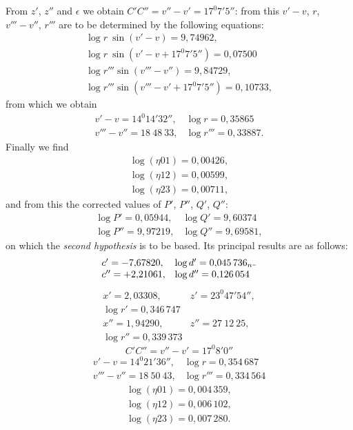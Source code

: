 From $z'$, $z''$ and $\epsilon$ we obtain $C'C'' = v''-v' = 17^{0}7'5''$: from this
$v'-v$, $r$, $v'''-v''$, $r'''$ are to be determined by the following equations:
\[
\begin{array}{l}
\log r\ \sin(v'-v) = 9{,}74962, \\ \log r\ \sin(v'-v+17^{0}7'5'') = 0{,}07500 \\
\log r'''\sin(v'''-v'') = 9{,}84729, \\ \log r'''\sin(v'''-v'+17^{0}7'5'') = 0{,}10733,
\end{array}
\]
from which we obtain
\[
\begin{array}{ll}
v'-v = 14^{0}14'32'', & \log r = 0{,}35865 \\
v'''-v'' = 18\ 48\ 33, & \log r''' = 0{,}33887.
\end{array}
\]
Finally we find
\[
\begin{gathered}
\log(\eta 01) = 0{,}00426, \\ \log(\eta 12) = 0{,}00599, \\ \log(\eta 23) = 0{,}00711,
\end{gathered}
\]
and from this the corrected values of $P'$, $P''$, $Q'$, $Q''$:
\[
\begin{array}{ll}
\log P' = 0{,}05944, & \log Q' = 9{,}60374 \\
\log P'' = 9{,}97219, & \log Q'' = 9{,}69581,
\end{array}
\]
on which the \emph{second hypothesis} is to be based. Its principal results
are as follows:
\[
\begin{array}{ll}
c' = -7{,}67820, & \log d' = 0{,}045\,736_n\mathord{\rule[.1ex]{.35em}{.35pt}} \\
c'' = +2{,}21061, & \log d'' = 0{,}126\,054
\end{array}
\]
\[
\begin{array}{ll}
x' = 2{,}03308, & z' = 23^{0}47'54'',\\
\log r' = 0{,}346\,747 & \\
x'' = 1{,}94290, & z'' = 27\ 12\ 25,\\
\log r'' = 0{,}339\,373 & 
\end{array}
\]
\[
C'C'' = v''-v' = 17^{0}8'0''
\]
\[
\begin{array}{ll}
v'-v = 14^{0}21'36'', & \log r = 0{,}354\,687 \\
v'''-v'' = 18\ 50\ 43, & \log r''' = 0{,}334\,564
\end{array}
\]
\[
\begin{gathered}
\log(\eta 01) = 0{,}004\,359, \\ \log(\eta 12) = 0{,}006\,102, \\ \log(\eta 23) = 0{,}007\,280.
\end{gathered}
\]
